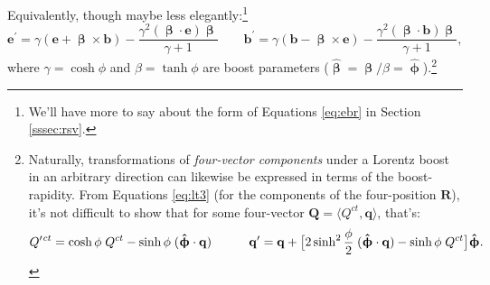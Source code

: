 \documentclass[12pt]{article}
\renewcommand{\vv}[1]{\mathbf{#1}}
\newcommand{\vvbeta}{\bm{\upbeta}}
\newcommand{\hatbeta}{\bm{\hat{\upbeta}}}
\newcommand{\hatphi}{\bm{\hat{\upphi}}}
\begin{document}
Equivalently, though maybe less elegantly:\footnote{We'll have more to say about the form of Equations \ref{eq:ebr} in Section \ref{sssec:rsv}.}
\begin{equation}\label{eq:ebvec}
\vv e^\prime = \gamma \left( \vv e + \vvbeta \times \vv b \right) - \dfrac{\gamma^2 (\vvbeta \cdot \vv e) \vvbeta}{\gamma + 1} \qquad \vv b^\prime = \gamma \left( \vv b - \vvbeta \times \vv e \right) - \dfrac{\gamma^2 (\vvbeta \cdot \vv b) \vvbeta}{\gamma + 1},
\end{equation}
where $\gamma = \cosh{\phi}$ and $\beta = \tanh{\phi}$ are boost parameters ($\hatbeta = \vvbeta / \beta = \hatphi$).\footnote{Naturally, transformations of \emph{four-vector components} under a Lorentz boost in an arbitrary direction can likewise be expressed in terms of the boost-rapidity. From Equations \ref{eq:lt3} (for the components of the four-position $\vv R$), it's not difficult to show that for some four-vector $\vv Q = \langle Q^{ct}, \vv q \rangle$, that's:
\begin{equation*}
Q^{\prime  \mkern1.5mu ct} = \cosh \phi \; Q^{ct} - \sinh \phi \; ( \hatphi \cdot \vv q ) \qquad \quad
\vv q^{\prime} = \vv q + \big[ 2 \sinh^2 \frac{\phi}{2} \; ( \hatphi \cdot \vv q ) - \sinh \phi \; Q^{ct} \big] \hatphi .
\end{equation*}}
\end{document}
